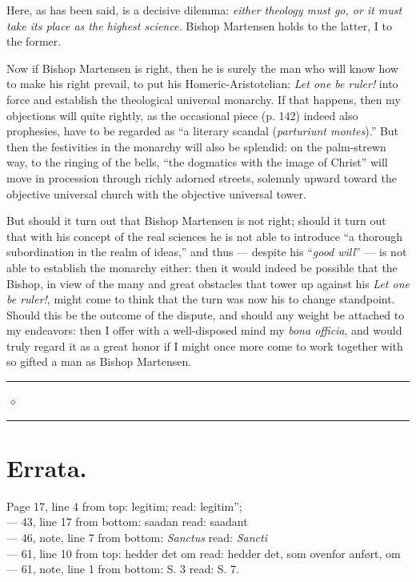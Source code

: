 \documentclass[12pt]{book}
\newcommand{\opage}[1]{\marginnote{\footnotesize\textit{[#1]}}}
\begin{document}
Here, as has been said, is a decisive dilemma: \emph{either theology must go, or it must take its place as the highest science.} Bishop Martensen holds to the latter, I to the former.

Now if Bishop Martensen is right, then he is surely the man who will know how to make his right prevail, to put his Homeric-Aristotelian: \emph{Let one be ruler!} into force and establish the theological universal monarchy. If that happens, then my objections will quite rightly, as the occasional piece (p. 142) indeed also prophesies, have to be regarded as ``a literary scandal (\textit{parturiunt montes}).'' But then the festivities in the monarchy will also be splendid: on the palm-strewn way, to the ringing of the bells, ``the dogmatics with the image of Christ'' will move in procession through richly adorned streets, solemnly upward toward the objective universal church with the objective universal tower.

But should it turn out that Bishop Martensen is not right; should it turn out that with his concept of the real sciences he is not able to introduce ``a thorough subordination in the realm of ideas,'' and thus --- despite his ``\emph{good will}'' ---
\opage{141}\setcounter{footnote}{0}%
is not able to establish the monarchy either: then it would indeed be possible that the Bishop, in view of the many and great obstacles that tower up against his \emph{Let one be ruler!}, might come to think that the turn was now his to change standpoint. Should this be the outcome of the dispute, and should any weight be attached to my endeavors: then I offer with a well-disposed mind my \textit{bona officia}, and would truly regard it as a great honor if I might once more come to work together with so gifted a man as Bishop Martensen.

\begin{center}
\rule[0.5ex]{3em}{0.4pt}\,$\diamond$\,\rule[0.5ex]{3em}{0.4pt}
\end{center}

\section*{Errata.}
\noindent
Page 17, line 4 from top: legitim; read: legitim'';\\
--- 43, line 17 from bottom: saadan read: saadant\\
--- 46, note, line 7 from bottom: \textit{Sanctus} read: \textit{Sancti}\\
--- 61, line 10 from top: hedder det om read: hedder det, som ovenfor anført, om\\
--- 61, note, line 1 from bottom: S. 3 read: S. 7.
\end{document}
